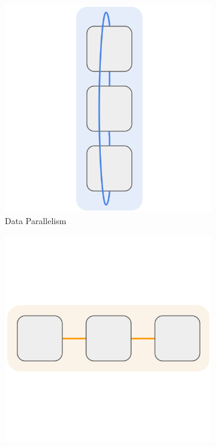 \documentclass{article}
\begin{document}
\begin{figure}[ht]
    \centering
    \begin{subfigure}[b]{0.22\textwidth}
        \centering
        \includegraphics[width=\textwidth]{figures/dp.png}
        \caption{Data Parallelism}
        \label{fig:dp}
    \end{subfigure}
    \hfill
    \begin{subfigure}[b]{0.22\textwidth}
        \centering
        \includegraphics[width=\textwidth]{figures/pp.png}

\end{subfigure}
\end{figure}
\end{document}
